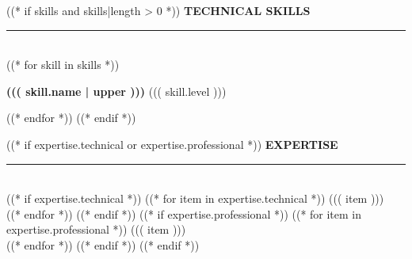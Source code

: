\documentclass[11pt,a4paper]{article}
\begin{document}
\begin{minipage}[t]{0.35\textwidth}
\begin{minipage}[t]{0.82\textwidth}
((* if skills and skills|length > 0 *))
{\fontsize{9}{11}\selectfont\bfseries\color{banner}\MakeUppercase{Technical Skills}}\\[2pt]
{\color{divider}\rule{\linewidth}{0.6pt}}\\[8pt]
((* for skill in skills *))
\begin{minipage}{\linewidth}
{\fontsize{7.5}{9}\selectfont\bfseries ((( skill.name | upper )))} \hfill {\scriptsize ((( skill.level )))}\\[3pt]
\end{minipage}
\vspace{8pt}
((* endfor *))
\vspace{7pt}
((* endif *))

((* if expertise.technical or expertise.professional *))
{\fontsize{9}{11}\selectfont\bfseries\color{banner}\MakeUppercase{Expertise}}\\[2pt]
{\color{divider}\rule{\linewidth}{0.6pt}}\\[8pt]
((* if expertise.technical *))
((* for item in expertise.technical *))
{\scriptsize\faCheckCircle\hspace{6pt} ((( item )))}\\[4pt]
((* endfor *))
((* endif *))
((* if expertise.professional *))
\vspace{4pt}
((* for item in expertise.professional *))
{\scriptsize\faCheckCircle\hspace{6pt} ((( item )))}\\[4pt]
((* endfor *))
((* endif *))
((* endif *))

\end{minipage}
\end{minipage}
\end{document}
